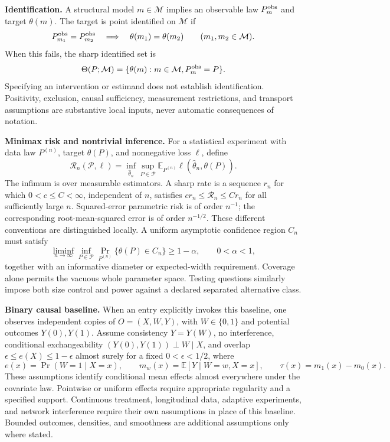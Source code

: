 \documentclass[11pt,a4paper]{article}
\newcommand{\E}{\mathbb E}
\begin{document}
\textbf{Identification.}
A structural model $m\in\mathcal M$ implies an observable law
$P_m^{\rm obs}$ and target $\theta(m)$. The target is point identified on
$\mathcal M$ if
\[
 P_{m_1}^{\rm obs}=P_{m_2}^{\rm obs}
 \quad\Longrightarrow\quad\theta(m_1)=\theta(m_2)
 \qquad(m_1,m_2\in\mathcal M).
\]
When this fails, the sharp identified set is
\[
 \Theta(P;\mathcal M)=\{\theta(m):m\in\mathcal M,
                                  P_m^{\rm obs}=P\}.
\]
Specifying an intervention or estimand does not establish identification.
Positivity, exclusion, causal sufficiency, measurement restrictions, and
transport assumptions are substantive local inputs, never automatic
consequences of notation.

\textbf{Minimax risk and nontrivial inference.}
For a statistical experiment with data law $P^{(n)}$, target $\theta(P)$,
and nonnegative loss $\ell$, define
\[
 \mathcal R_n(\mathcal P,\ell)
   =\inf_{\widehat\theta_n}\sup_{P\in\mathcal P}
      \E_{P^{(n)}}\ell(\widehat\theta_n,\theta(P)).
\]
The infimum is over measurable estimators. A sharp rate is a sequence
$r_n$ for which $0<c\leq C<\infty$, independent of $n$, satisfies
$c r_n\leq\mathcal R_n\leq C r_n$ for all sufficiently large $n$.
Squared-error parametric risk is of order $n^{-1}$; the corresponding
root-mean-squared error is of order $n^{-1/2}$. These different conventions
are distinguished locally. A uniform asymptotic confidence region $C_n$
must satisfy
\[
 \liminf_{n\to\infty}\inf_{P\in\mathcal P}
     \Pr_{P^{(n)}}\{\theta(P)\in C_n\}\geq 1-\alpha,
 \qquad 0<\alpha<1,
\]
together with an informative diameter or expected-width requirement.
Coverage alone permits the vacuous whole parameter space. Testing questions
similarly impose both size control and power against a declared separated
alternative class.

\textbf{Binary causal baseline.}
When an entry explicitly invokes this baseline, one observes independent
copies of $O=(X,W,Y)$, with $W\in\{0,1\}$ and potential outcomes $Y(0),Y(1)$.
Assume consistency $Y=Y(W)$, no interference, conditional exchangeability
$(Y(0),Y(1))\perp W\mid X$, and overlap
$\epsilon\leq e(X)\leq1-\epsilon$ almost surely for a fixed
$0<\epsilon<1/2$, where
\[
 e(x)=\Pr(W=1\mid X=x),\qquad
 m_w(x)=\E[Y\mid W=w,X=x],\qquad
 \tau(x)=m_1(x)-m_0(x).
\]
These assumptions identify conditional mean effects almost everywhere
under the covariate law. Pointwise or uniform effects require appropriate
regularity and a specified support. Continuous treatment, longitudinal
data, adaptive experiments, and network interference require their own
assumptions in place of this baseline. Bounded outcomes, densities, and
smoothness are additional assumptions only where stated.
\end{document}
